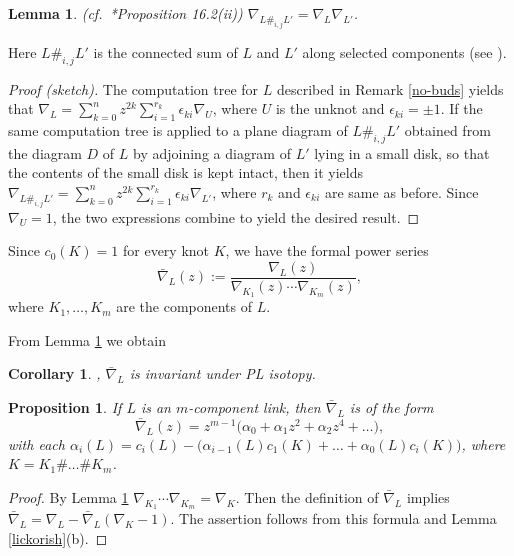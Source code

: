 \documentclass[a4paper,12pt,reqno,oneside]{amsart} %
\theoremstyle{plain}
\newtheorem{lemma}[theorem]{Lemma}
\newtheorem{proposition}[theorem]{Proposition}
\newtheorem{corollary}[theorem]{Corollary}
\theoremstyle{definition}
\theoremstyle{named}
\renewcommand{\:}{\colon}
\begin{document}
\begin{lemma} \label{insertion} {\rm (cf.\ \cite{Lic}*{Proposition 16.2(ii)})} 
$\nabla_{L\#_{i,j} L'}=\nabla_L\nabla_{L'}$.
\end{lemma}

Here $L\#_{i,j} L'$ is the connected sum of $L$ and $L'$ along selected components (see \cite{M24-1'}).

\begin{proof}[Proof (sketch)]
The computation tree for $L$ described in Remark \ref{no-buds} yields that
$\nabla_L=\sum_{k=0}^n z^{2k}\sum_{i=1}^{r_k}\epsilon_{ki}\nabla_U$, where $U$ is the unknot and $\epsilon_{ki}=\pm1$.
If the same computation tree is applied to a plane diagram of $L\#_{i,j} L'$ obtained from the diagram $D$ of $L$ by adjoining 
a diagram of $L'$ lying in a small disk, so that the contents of the small disk is kept intact, then it yields
$\nabla_{L\#_{i,j} L'}=\sum_{k=0}^n z^{2k}\sum_{i=1}^{r_k}\epsilon_{ki}\nabla_{L'}$, where $r_k$ and $\epsilon_{ki}$ are same as before.
Since $\nabla_U=1$, the two expressions combine to yield the desired result.
\end{proof}

Since $c_0(K)=1$ for every knot $K$, we have the formal power series
\[\bar\nabla_L(z):=\dfrac{\nabla_L(z)}{\nabla_{K_1}(z)\cdots\nabla_{K_m}(z)},\] 
where $K_1,\dots,K_m$ are the components of $L$.

From Lemma \ref{insertion} we obtain

\begin{corollary} \cite{Tr2}, \cite{Ro4} \label{locknot} $\bar\nabla_L$ is invariant under PL isotopy.
\end{corollary}

\begin{proposition} \label{reduced-coefficients}
If $L$ is an $m$-component link, then $\bar\nabla_L$ is of the form 
\[\bar\nabla_L(z)=z^{m-1}\big(\alpha_0+\alpha_1z^2+\alpha_2z^4+\dots\big),\]
with each $\alpha_i(L)=c_i(L)-\big(\alpha_{i-1}(L)c_1(K)+\dots+\alpha_0(L)c_i(K)\big)$, where
$K=K_1\#\dots\#K_m$.
\end{proposition}

\begin{proof} By Lemma \ref{insertion} $\nabla_{K_1}\cdots\nabla_{K_m}=\nabla_K$.
Then the definition of $\bar\nabla_L$ implies 
$\bar\nabla_L=\nabla_L-\bar\nabla_L(\nabla_K-1)$.
The assertion follows from this formula and Lemma \ref{lickorish}(b).
\end{proof}
\end{document}
